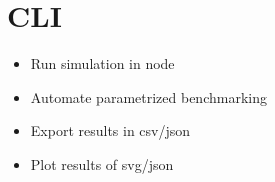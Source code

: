 \section{CLI}
\begin{itemize}
    \item Run simulation in node
    \item Automate parametrized benchmarking
    \item Export results in csv/json
    \item Plot results of svg/json
\end{itemize}